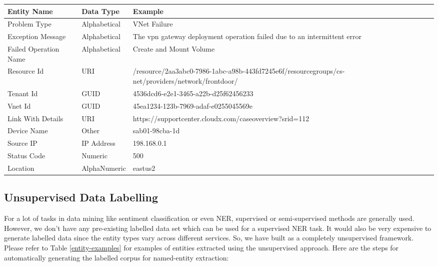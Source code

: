 \begin{table*}[!ht]
\small
\caption{Examples of entities extracted by \softner{}}
\vspace{-6pt}
\label{entity-examples}
\begin{tabular}{lll}
\toprule
\textbf{Entity Name} & \textbf{Data Type} & \textbf{Example} \\
\midrule
Problem Type & Alphabetical & VNet Failure \\[-1pt]
Exception Message & Alphabetical & The vpn gateway deployment operation failed due to an intermittent error \\[-1pt]
Failed Operation Name & Alphabetical & Create and Mount Volume \\[-1pt]
Resource Id & URI & /resource/2aa3abc0-7986-1abc-a98b-443fd7245e6f/resourcegroups/cs-net/providers/network/frontdoor/ \\[-1pt]
Tenant Id & GUID & 4536dcd6-e2e1-3465-a22b-d25f62456233 \\[-1pt]
Vnet Id & GUID & 45ea1234-123b-7969-adaf-e0255045569e \\[-1pt]
Link With Details & URI & https://supportcenter.cloudx.com/caseoverview?srid=112\\[-1pt]
Device Name & Other & sab01-98cba-1d \\[-1pt]
Source IP & IP Address & 198.168.0.1 \\[-1pt]
Status Code & Numeric & 500 \\[-1pt]
Location & AlphaNumeric & eastus2\\[-1pt]
\bottomrule
\end{tabular}
\end{table*}

\subsection{Unsupervised Data Labelling}
For a lot of tasks in data mining like sentiment classification or even NER, supervised or semi-supervised methods are generally used. However, we don't have any pre-existing labelled data set which can  be used for a supervised NER task. It would also be very expensive to generate labelled data since the entity types vary across different services. So, we have built \softner{} as a completely unsupervised framework. Please refer to Table \ref{entity-examples} for examples of entities extracted using the unsupervised approach. Here are the steps for automatically generating the labelled corpus for named-entity extraction:

